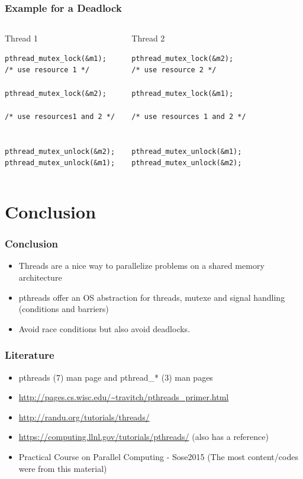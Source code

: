 \documentclass[10pt]{beamer}
\begin{document}
\begin{frame}[fragile]
    \frametitle{Example for a Deadlock}
\begin{columns}
\begin{block}{Thread 1}
\begin{lstlisting}
pthread_mutex_lock(&m1);
/* use resource 1 */ 

pthread_mutex_lock(&m2);

/* use resources1 and 2 */ 


pthread_mutex_unlock(&m2);
pthread_mutex_unlock(&m1); 
\end{lstlisting}
\end{block}


\begin{block}{Thread 2}
\begin{lstlisting}
pthread_mutex_lock(&m2);
/* use resource 2 */ 

pthread_mutex_lock(&m1);

/* use resources 1 and 2 */ 


pthread_mutex_unlock(&m1);
pthread_mutex_unlock(&m2); 
\end{lstlisting}
\end{block}
\end{columns}
\end{frame}


\section{Conclusion}
\begin{frame}
    \frametitle{Conclusion}
    \begin{itemize}
        \item Threads are a nice way to parallelize problems on a shared memory architecture
        \item pthreads offer an OS abstraction for threads, mutexe and signal handling (conditions and barriers)
        \item Avoid race conditions but also avoid deadlocks.
    \end{itemize}
\end{frame}

\begin{frame}
    \frametitle{Literature}
    \begin{itemize}
        \item pthreads (7) man page and pthread\_* (3) man pages
        \item \url{http://pages.cs.wisc.edu/~travitch/pthreads_primer.html}
        \item \url{http://randu.org/tutorials/threads/}
        \item \url{https://computing.llnl.gov/tutorials/pthreads/} (also has a reference)
        \item Practical Course on Parallel Computing - Sose2015 (The most content/codes were from this material)
    \end{itemize}
\end{frame}
\end{document}
